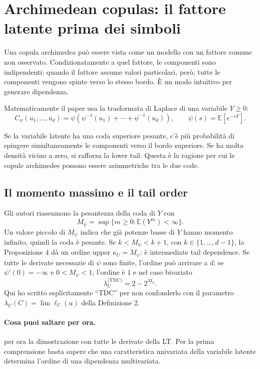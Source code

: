 \documentclass[11pt,a4paper]{article}
\newcommand{\Salta}{\paragraph{Cosa puoi saltare per ora.}}
\begin{document}
\section{Archimedean copulas: il fattore latente prima dei simboli}

Una copula archimedea può essere vista come un modello con un fattore comune
non osservato. Condizionatamente a quel fattore, le componenti sono
indipendenti; quando il fattore assume valori particolari, però, tutte le
componenti vengono spinte verso lo stesso bordo. È un modo intuitivo per
generare dipendenza.

Matematicamente il paper usa la trasformata di Laplace di una variabile
$Y\geq0$:
\begin{equation}
 C_\psi(u_1,\ldots,u_d)=
 \psi\!\left(\psi^{-1}(u_1)+\cdots+\psi^{-1}(u_d)\right),
 \qquad \psi(s)=\mathbb E[e^{-sY}].
 \label{eq:arch-lt}
\end{equation}

Se la variabile latente ha una coda superiore pesante, c'è più probabilità di
spingere simultaneamente le componenti verso il bordo superiore. Se ha molta
densità vicino a zero, si rafforza la lower tail. Questa è la ragione per cui
le copule archimedee possono essere asimmetriche tra le due code.

\subsection{Il momento massimo e il tail order}
Gli autori riassumono la pesantezza della coda di $Y$ con
\begin{equation}
 M_\psi=\sup\{m\geq0:\mathbb E(Y^m)<\infty\}.
 \label{eq:max-moment}
\end{equation}
Un valore piccolo di $M_\psi$ indica che già potenze basse di $Y$ hanno
momento infinito, quindi la coda è pesante. Se $k<M_\psi<k+1$, con
$k\in\{1,\ldots,d-1\}$, la Proposizione 4 dà un ordine upper
$\kappa_U=M_\psi$: è intermediate tail dependence. Se tutte le derivate
necessarie di $\psi$ sono finite, l'ordine può arrivare a $d$; se
$\psi'(0)=-\infty$ e $0<M_\psi<1$, l'ordine è $1$ e nel caso bivariato
\begin{equation}
 \lambda_U^{\text{(TDC)}}=2-2^{M_\psi}.
 \label{eq:arch-upper-lambda}
\end{equation}
Qui ho scritto esplicitamente ``TDC'' per non confonderlo con il parametro
$\lambda_U(C)=\lim\ell_U(u)$ della Definizione 2.

\Salta per ora la dimostrazione con tutte le derivate della LT. Per la prima
comprensione basta sapere che una caratteristica univariata della variabile
latente determina l'ordine di una dipendenza multivariata.
\end{document}
